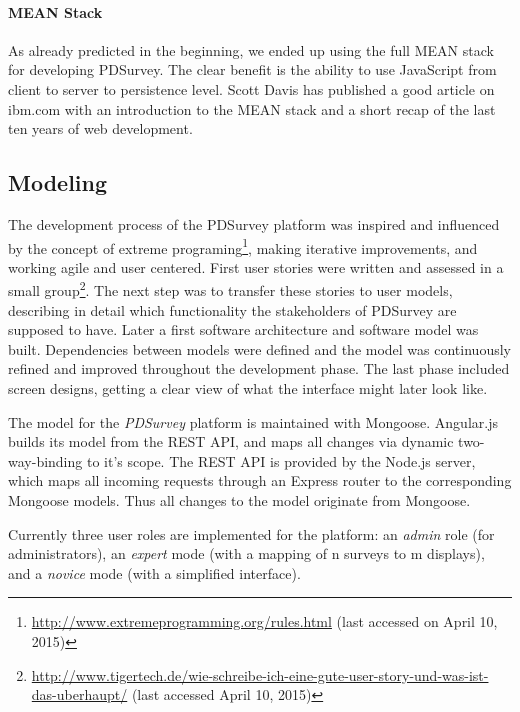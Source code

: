 		\paragraph{MEAN Stack}
		As already predicted in the beginning, we ended up using the full MEAN stack for developing PDSurvey. The clear benefit is the ability to use JavaScript from client to server to persistence level. Scott Davis has published a good article on ibm.com with an introduction to the MEAN stack and a short recap of the last ten years of web development\cite{Scott2014MEANStack}.






\clearpage

\subsection{Modeling}
\label{chapter:implementation:modeling}

	The development process of the PDSurvey platform was inspired and influenced by the concept of extreme programing\footnote{\url{http://www.extremeprogramming.org/rules.html} (last accessed on April 10, 2015)}, making iterative improvements, and working agile and user centered. First user stories were written and assessed in a small group\footnote{\url{http://www.tigertech.de/wie-schreibe-ich-eine-gute-user-story-und-was-ist-das-uberhaupt/} (last accessed April 10, 2015)}. The next step was to transfer these stories to user models, describing in detail which functionality the stakeholders of PDSurvey are supposed to have. Later a first software architecture and software model was built. Dependencies between models were defined and the model was continuously refined and improved throughout the development phase. The last phase included screen designs, getting a clear view of what the interface might later look like.

	The model for the \textit{PDSurvey} platform is maintained with Mongoose. Angular.js builds its model from the REST API, and maps all changes via dynamic two-way-binding to it's scope. The REST API is provided by the Node.js server, which maps all incoming requests through an Express router to the corresponding Mongoose models. Thus all changes to the model originate from Mongoose.

	Currently three user roles are implemented for the platform: an \textit{admin} role (for administrators), an \textit{expert} mode (with a mapping of n surveys to m displays), and a \textit{novice} mode (with a simplified interface).


